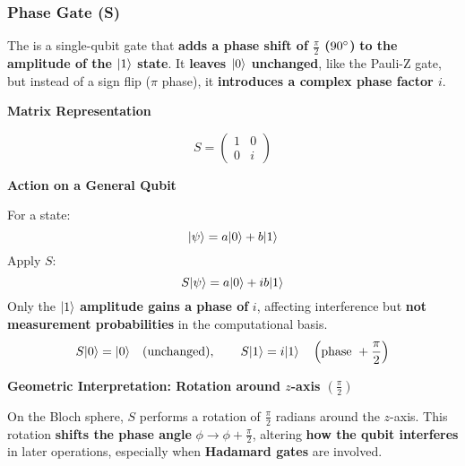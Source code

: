 \subsubsection{Phase Gate (S)}

The  is a single-qubit gate that \textbf{adds a phase shift of $\frac{\pi}{2}$ ($90\degree$)} \textbf{to the amplitude of the $| 1 \rangle$ state}. It \textbf{leaves $| 0 \rangle$ unchanged}, like the Pauli-Z gate, but instead of a sign flip ($\pi$ phase), it \textbf{introduces a complex phase factor $i$}.

\highspace
\begin{flushleft}
    \textcolor{Green3}{ \textbf{Matrix Representation}}
\end{flushleft}
\begin{equation}
    S = \begin{pmatrix}
        1 & 0 \\ 0 & i
    \end{pmatrix}
\end{equation}

\highspace
\begin{flushleft}
    \textcolor{Green3}{ \textbf{Action on a General Qubit}}
\end{flushleft}
For a state:
\begin{equation*}
    | \psi \rangle = a| 0 \rangle + b| 1 \rangle
\end{equation*}
Apply $S$:
\begin{equation*}
    S| \psi \rangle = a| 0 \rangle + ib| 1 \rangle
\end{equation*}
Only the $| 1 \rangle$ \textbf{amplitude gains a phase of} $i$, affecting interference but \textbf{not measurement probabilities} in the computational basis.
\begin{equation*}
    S| 0 \rangle = | 0 \rangle \hspace{1em} \text{(unchanged)}, \hspace{2em} S| 1 \rangle = i| 1 \rangle \hspace{1em} \left(\text{phase } + \frac{\pi}{2}\right)
\end{equation*}

\highspace
\begin{flushleft}
    \textcolor{Green3}{ \textbf{Geometric Interpretation: Rotation around $z$-axis $\left(\frac{\pi}{2}\right)$}}
\end{flushleft}
On the Bloch sphere, $S$ performs a rotation of $\frac{\pi}{2}$ radians around the $z$-axis. This rotation \textbf{shifts the phase angle} $\phi \rightarrow \phi + \frac{\pi}{2}$, altering \textbf{how the qubit interferes} in later operations, especially when \textbf{Hadamard gates} are involved.

